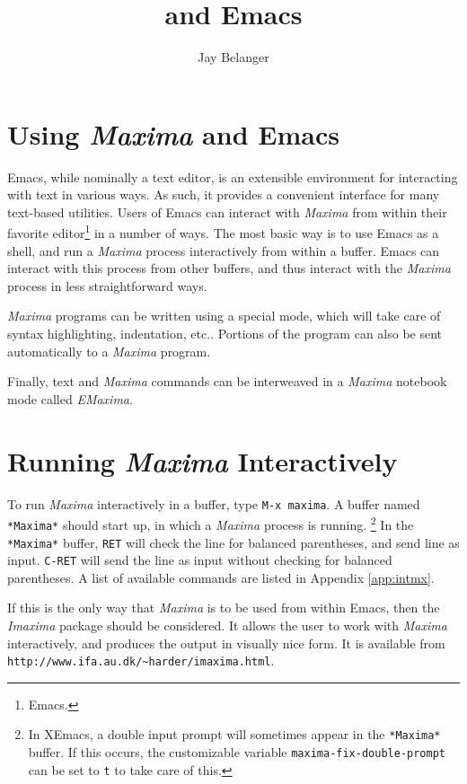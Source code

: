 \documentclass{article}
\title{\mx{} and Emacs}
\author{Jay Belanger}
\date{}
\newcommand{\emx}{\textsl{\sffamily EMaxima}}
\newcommand{\mx}{\textsl{\sffamily Maxima}}
\begin{document}
\maketitle

\section{Using \mx{} and Emacs}

Emacs, while nominally a text editor, is an extensible environment for
interacting with text in various ways.  As such, it provides a
convenient interface for many text-based utilities.  Users of Emacs
can interact with \mx{} from within their favorite
editor\footnote{Emacs.} in a number of ways.  The most basic way is to
use Emacs as a shell, and run a \mx{} process interactively from
within a buffer.  Emacs can interact with this process from other
buffers, and thus interact with the \mx{} process in less
straightforward ways.

\mx{} programs can be written using a special mode, which will take
care of syntax highlighting, indentation, etc..  Portions of the
program can also be sent automatically to a \mx{} program.

Finally, text and \mx{} commands can be interweaved in a \mx{}
notebook mode called \emx{}.

\section{Running \mx{} Interactively}

To run \mx{} interactively in a buffer, type \texttt{M-x maxima}.  A
buffer named \texttt{*Maxima*} should start up, in which a \mx{}
process is running.%
\footnote{In XEmacs, a double input prompt will sometimes appear in
  the \texttt{*Maxima*} buffer.  If this occurs, the customizable
  variable \texttt{maxima-fix-double-prompt} can be set to \texttt{t}
  to take care of this.}
In the \texttt{*Maxima*} buffer, \texttt{RET}
will check the line for balanced parentheses, and send line as input.
\texttt{C-RET} will send the line as input without checking for
balanced parentheses.  A list of available commands are listed in
Appendix \ref{app:intmx}.

If this is the only way that \mx{} is to be used from within Emacs,
then the \textsl{Imaxima} package should be considered.  It allows the
user to work with \mx{} interactively, and produces the output in
visually nice form.  It is available from
\verb+http://www.ifa.au.dk/~harder/imaxima.html+.
\end{document}
